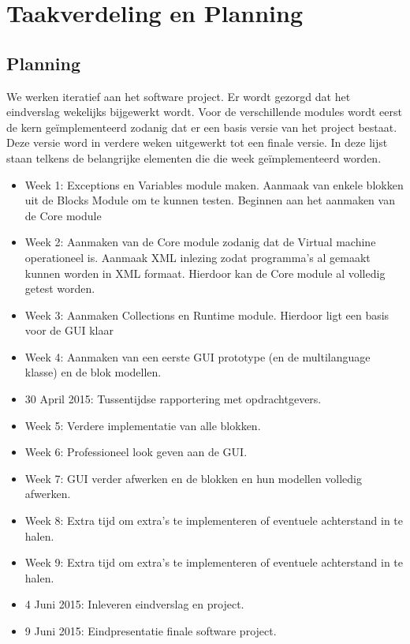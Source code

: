 \documentclass[]{article}
\begin{document}
\section{Taakverdeling en Planning}
\label{Taakverdeling}

\subsection{Planning}
We werken iteratief aan het software project. Er wordt gezorgd dat het eindverslag wekelijks bijgewerkt wordt. Voor de verschillende modules wordt eerst de kern ge\"{i}mplementeerd zodanig dat er een basis versie van het project bestaat. Deze versie word in verdere weken uitgewerkt tot een finale versie. In deze lijst staan telkens de belangrijke elementen die die week ge\"{i}mplementeerd worden.
\begin{itemize}
\item Week 1: Exceptions en Variables module maken. Aanmaak van enkele blokken uit de Blocks Module om te kunnen testen. Beginnen aan het aanmaken van de Core module
\item Week 2: Aanmaken van de Core module zodanig dat de Virtual machine operationeel is. Aanmaak XML inlezing zodat programma's al gemaakt kunnen worden in XML formaat. Hierdoor kan de Core module al volledig getest worden.
\item Week 3: Aanmaken Collections en Runtime module. Hierdoor ligt een basis voor de GUI klaar 
\item Week 4: Aanmaken van een eerste GUI prototype (en de multilanguage klasse) en de blok modellen.
\item 30 April 2015: Tussentijdse rapportering met opdrachtgevers.
\item Week 5: Verdere implementatie van alle blokken.
\item Week 6: Professioneel look geven aan de GUI.
\item Week 7: GUI verder afwerken en de blokken en hun modellen volledig afwerken.
\item Week 8: Extra tijd om extra's te implementeren of eventuele achterstand in te halen.
\item Week 9: Extra tijd om extra's te implementeren of eventuele achterstand in te halen.
\item 4 Juni 2015: Inleveren eindverslag en project.
\item 9 Juni 2015: Eindpresentatie finale software project.
\end{itemize}
\end{document}
